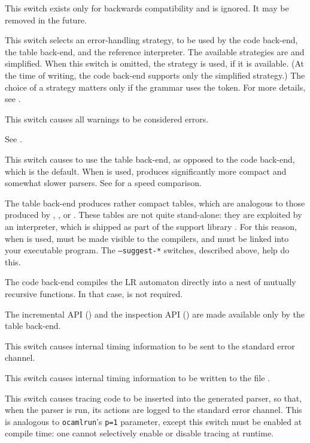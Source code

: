 \documentclass[onecolumn,11pt,nocopyrightspace,preprint]{sigplanconf}
\begin{document}
 This switch exists only for
backwards compatibility and is ignored. It may be removed in the future.

 This switch selects an error-handling
strategy, to be used by the code back-end, the table back-end, and the
reference interpreter. The available strategies are \legacy and simplified.
When this switch is omitted, the \legacy strategy is used, if it is available.
(At the time of writing, the code back-end supports only the simplified
strategy.) The choice of a strategy matters only if the grammar uses the
\error token. For more details, see .

\docswitch{\ostrict} This switch causes all warnings to be considered errors.

 See .

\docswitch{\otable} This switch causes \menhir to use the table back-end, as
opposed to the code back-end, which is the default. When \otable is used,
\menhir produces significantly more compact and somewhat slower parsers. See
 for a speed comparison.

The table back-end produces rather compact tables, which are analogous
to those produced by \yacc, \bison, or \ocamlyacc. These tables are not quite
stand-alone: they are exploited by an interpreter, which is shipped as part of
the support library \menhirlib. For this reason, when \otable is used,
\menhirlib must be made visible to the \ocaml compilers, and must be linked
into your executable program. The \texttt{--suggest-*} switches, described
above, help do this.

The code back-end compiles the LR automaton directly into a nest of
mutually recursive \ocaml functions. In that case, \menhirlib is not required.

The incremental API () and the inspection API
() are made available only by the table back-end.

\docswitch{\otimings} This switch causes internal timing information to
be sent to the standard error channel.

 This switch causes internal timing
information to be written to the file .

\docswitch{\otrace} This switch causes tracing code to be inserted into
the generated parser, so that, when the parser is run, its actions are
logged to the standard error channel. This is analogous to \texttt{ocamlrun}'s
\texttt{p=1} parameter, except this switch must be enabled at compile time:
one cannot selectively enable or disable tracing at runtime.
\end{document}
